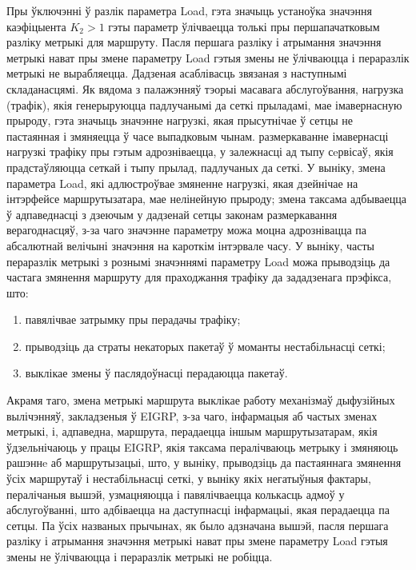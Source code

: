 Пры ўключэнні ў разлік параметра Load, гэта значыць устаноўка значэння
каэфіцыента $K_2 > 1$ гэты параметр ўлічваецца толькі пры першапачатковым
разліку метрыкі для маршруту. Пасля першага разліку і атрымання значэння
метрыкі нават пры змене параметру Load гэтыя змены не ўлічваюцца
і пераразлік метрыкі не вырабляецца. Дадзеная асаблівасць звязаная з наступнымі складанасцямі. Як вядома з палажэнняў тэорыі масавага абслугоўвання, нагрузка (трафік), якія генерыруюцца падлучанымі да сеткі прыладамі,
мае імавернасную прыроду, гэта значыць значэнне нагрузкі, якая прысутнічае ў сетцы
не пастаянная і змяняецца ў часе выпадковым чынам. размеркаванне імавернасці нагрузкі трафіку пры гэтым адрозніваецца, у залежнасці
ад тыпу сeрвісаў, якія прадстаўляюцца сеткай і тыпу прылад, падлучаных
да сеткі. У выніку, змена параметра Load, які адлюстроўвае змяненне
нагрузкі, якая дзейнічае на інтэрфейсе маршрутызатара, мае нелінейную
прыроду; змена таксама адбываецца ў адпаведнасці з дзеючым у дадзенай
сетцы законам размеркавання верагоднасцяў, з-за чаго значэнне параметру можа моцна адрознівацца па абсалютнай велічыні значэння на
кароткім інтэрвале часу. У выніку, часты пераразлік метрыкі з рознымі значэннямі параметру Load можа прыводзіць да частага
змянення маршруту для праходжання трафіку да зададзенага прэфікса, што:
\begin{enumerate}
    \item павялічвае затрымку пры перадачы трафіку;
    \item прыводзіць да страты некаторых пакетаў ў моманты нестабільнасці сеткі;
    \item выклікае змены ў паслядоўнасці перадаюцца пакетаў.
\end{enumerate}

Акрамя таго, змена метрыкі маршрута выклікае работу механізмаў
дыфузійных вылічэнняў, закладзеныя ў EIGRP, з-за чаго, інфармацыя
аб частых зменах метрыкі, і, адпаведна, маршрута, перадаецца
іншым маршрутызатарам, якія ўдзельнічаюць у працы EIGRP, якія таксама пералічваюць
метрыку і змяняюць рашэннe аб маршрутызацыі, што, у выніку, прыводзіць да
пастаяннага змянення ўсіх маршрутаў і нестабільнасці сеткі,
у выніку якіх негатыўныя фактары, пералічаныя вышэй, узмацняюцца
і павялічваецца колькасць адмоў у абслугоўванні, што адбіваецца на даступнасці інфармацыі, якая перадаецца па сетцы.
Па ўсіх названых прычынах, як было адзначана вышэй, пасля першага
разліку і атрымання значэння метрыкі нават пры змене параметру Load гэтыя
змены не ўлічваюцца і пераразлік метрыкі не робіцца.


